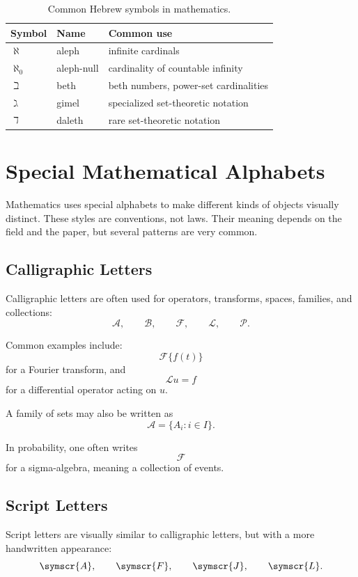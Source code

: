 \documentclass[11pt,twocolumn]{article}
\begin{document}
\begin{table}[ht]
\centering
\caption{Common Hebrew symbols in mathematics.}
\begin{tabular}{lll}
\toprule
Symbol & Name & Common use \\
\midrule
$\aleph$ & aleph & infinite cardinals \\
$\aleph_0$ & aleph-null & cardinality of countable infinity \\
$\beth$ & beth & beth numbers, power-set cardinalities \\
$\gimel$ & gimel & specialized set-theoretic notation \\
$\daleth$ & daleth & rare set-theoretic notation \\
\bottomrule
\end{tabular}
\end{table}

\section{Special Mathematical Alphabets}

Mathematics uses special alphabets to make different kinds of objects visually
distinct. These styles are conventions, not laws. Their meaning depends on the
field and the paper, but several patterns are very common.

\subsection{Calligraphic Letters}

Calligraphic letters are often used for operators, transforms, spaces, families,
and collections:
\[
\mathcal{A},
\qquad
\mathcal{B},
\qquad
\mathcal{F},
\qquad
\mathcal{L},
\qquad
\mathcal{P}.
\]

Common examples include:
\[
\mathcal{F}\{f(t)\}
\]
for a Fourier transform, and
\[
\mathcal{L}u = f
\]
for a differential operator acting on \(u\).

A family of sets may also be written as
\[
\mathcal{A}
=
\{A_i : i \in I\}.
\]

In probability, one often writes
\[
\mathcal{F}
\]
for a sigma-algebra, meaning a collection of events.

\subsection{Script Letters}

Script letters are visually similar to calligraphic letters, but with a more
handwritten appearance:
\[
\symscr{A},
\qquad
\symscr{F},
\qquad
\symscr{J},
\qquad
\symscr{L}.
\]
\end{document}
